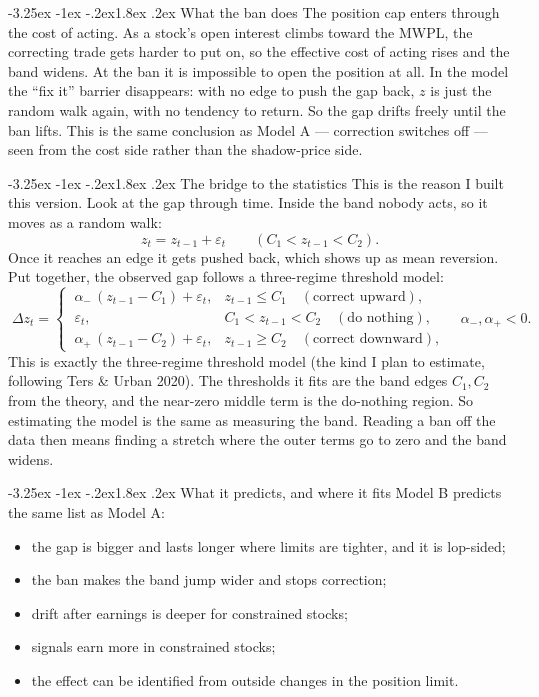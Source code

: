 \documentclass[11pt]{article}
\makeatletter
\renewcommand\section{\@startsection{section}{1}{\z@}%
  {-3.25ex \@plus -1ex \@minus -.2ex}{1.8ex \@plus.2ex}%
  {\normalfont\large\bfseries\color{owblue}}}
\makeatother
\begin{document}
\section{What the ban does}
The position cap enters through the cost of acting. As a stock's open interest climbs toward the MWPL, the correcting trade gets harder to put on, so the effective cost of acting rises and the band widens. At the ban it is impossible to open the position at all. In the model the ``fix it'' barrier disappears: with no edge to push the gap back, $z$ is just the random walk again, with no tendency to return. So the gap drifts freely until the ban lifts. This is the same conclusion as Model A --- correction switches off --- seen from the cost side rather than the shadow-price side.

\section{The bridge to the statistics}
This is the reason I built this version. Look at the gap through time. Inside the band nobody acts, so it moves as a random walk:
\[
z_t = z_{t-1} + \varepsilon_t \qquad (C_1 < z_{t-1} < C_2).
\]
Once it reaches an edge it gets pushed back, which shows up as mean reversion. Put together, the observed gap follows a three-regime threshold model:
\[
\boxed{\;\Delta z_t=
\begin{cases}
\ \alpha_-\,(z_{t-1}-C_1)+\varepsilon_t, & z_{t-1}\le C_1 \quad (\text{correct upward}),\\[2pt]
\ \varepsilon_t, & C_1<z_{t-1}<C_2 \quad (\text{do nothing}),\\[2pt]
\ \alpha_+\,(z_{t-1}-C_2)+\varepsilon_t, & z_{t-1}\ge C_2 \quad (\text{correct downward}),
\end{cases}\quad \alpha_-,\alpha_+<0.\;}
\]
This is exactly the three-regime threshold model (the kind I plan to estimate, following Ters \& Urban 2020). The thresholds it fits are the band edges $C_1,C_2$ from the theory, and the near-zero middle term is the do-nothing region. So estimating the model is the same as measuring the band. Reading a ban off the data then means finding a stretch where the outer terms go to zero and the band widens.

\section{What it predicts, and where it fits}
Model B predicts the same list as Model A:
\begin{itemize}
\item the gap is bigger and lasts longer where limits are tighter, and it is lop-sided;
\item the ban makes the band jump wider and stops correction;
\item drift after earnings is deeper for constrained stocks;
\item signals earn more in constrained stocks;
\item the effect can be identified from outside changes in the position limit.
\end{itemize}
\end{document}

